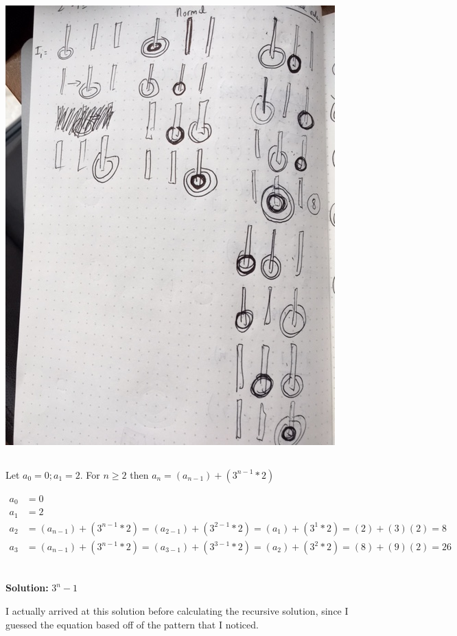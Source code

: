 \documentclass{article}
\begin{document}
\includegraphics[scale=.5]{towers-4} \\

\subsection{}

Let $a_0 = 0; a_1 = 2$. For $n \ge 2$ then $a_n = (a_{n-1}) + (3^{n-1} * 2)$


\begin{align*}
a_{0} &= 0 \\ 
a_{1} &= 2 \\ 
a_{2} &= (a_{n-1}) + (3^{n-1} * 2) = (a_{2-1}) + (3^{2-1} * 2) = (a_1) + (3^1 * 2) = (2) + (3)(2) = 8 \\ 
a_{3} &= (a_{n-1}) + (3^{n-1} * 2) = (a_{3-1}) + (3^{3-1} * 2) = (a_2) + (3^2 * 2) = (8) + (9)(2) = 26  \\ 
\end{align*}

\subsection{}

\textbf{Solution: } $3^n - 1$

I actually arrived at this solution before calculating the recursive solution, since I guessed the equation based off of the pattern that I noticed.
\end{document}
